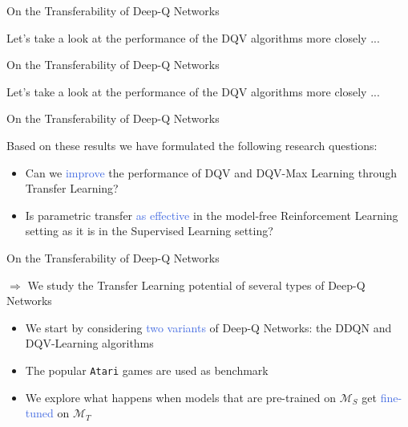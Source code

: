 \documentclass{beamer}
\begin{document}
\begin{frame}{On the Transferability of Deep-Q Networks}
	
	Let's take a look at the performance of the DQV algorithms more closely ...
	
	\bigskip
	

\end{frame}

\begin{frame}{On the Transferability of Deep-Q Networks}
	
	Let's take a look at the performance of the DQV algorithms more closely ...
	
	\bigskip
	

\end{frame}


\begin{frame}{On the Transferability of Deep-Q Networks}

	Based on these results we have formulated the following research questions:

	\begin{itemize}
		\item Can we \textcolor{RoyalBlue}{improve} the performance of DQV and DQV-Max Learning through Transfer Learning?
		\item Is parametric transfer \textcolor{RoyalBlue}{as effective} in the model-free Reinforcement Learning setting as it is in the Supervised Learning setting?
	\end{itemize}
	
\end{frame}

\begin{frame}{On the Transferability of Deep-Q Networks}

	$\Rightarrow$ We study the Transfer Learning potential of several types of Deep-Q Networks
	
	\bigskip
	\begin{itemize}
		\item We start by considering \textcolor{RoyalBlue}{two variants} of Deep-Q Networks: the DDQN and DQV-Learning algorithms
		\item The popular \texttt{Atari} games are used as benchmark
		\item We explore what happens when models that are pre-trained on $\mathcal{M}_S$ get \textcolor{RoyalBlue}{fine-tuned} on $\mathcal{M}_T$
	\end{itemize}

\end{frame}
\end{document}
